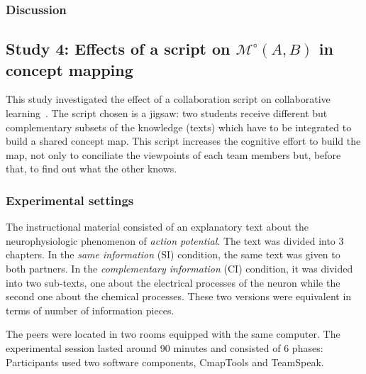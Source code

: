 \documentclass[natbib]{svjour3}
\newcommand{\gModel}[2]{{$\mathcal{M}^{\circ}(#1, #2)$}}
\begin{document}
\subsubsection*{Discussion}





\subsection{{\bf Study 4}:  Effects of a script on \gModel{A}{B}  in concept mapping}

This study investigated the effect of a collaboration script on collaborative
learning~\citep{molinari2008effects}. The script chosen is a {\sc jigsaw}: two students
receive different but complementary subsets of the knowledge (texts) which have
to be integrated to build a shared concept map.  This script increases the
cognitive effort to build the map, not only to conciliate the viewpoints of
each team members but, before that, to find out what the other knows. 

\subsubsection*{Experimental settings}

The instructional material consisted of an explanatory text about the
neurophysiologic phenomenon of \emph{action potential}. The text was divided
into 3 chapters.  In the \emph{same information} (SI) condition, the same text
was given to both partners. In the \emph{complementary information} (CI)
condition, it was divided into two sub-texts, one about the electrical processes
of the neuron while the second one about the chemical processes. These two
versions were equivalent in terms of number of information pieces. 

The peers were located in two rooms equipped with the same
computer.  The experimental session lasted around 90 minutes and consisted of 6
phases: Participants used two software components, {\sc CmapTools} and {\sc
TeamSpeak}.
\end{document}
